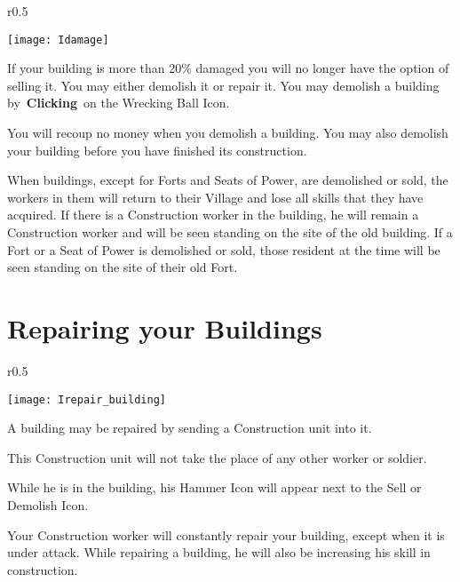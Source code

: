 	
\begin{wrapfigure}{r}{0.5\textwidth}
	\vspace{-20pt}
	\begin{center}
		\texttt{[image: Idamage]}
	\end{center}
	\vspace{-20pt}
\end{wrapfigure}

If your building is more than 20\% damaged you will no longer have the option of selling it. You may either demolish it or repair it. You may demolish a building by \textbf{Clicking} on the Wrecking Ball Icon.

You will recoup no money when you demolish a building. You may also demolish your building before you have finished its construction.

When buildings, except for Forts and Seats of Power, are demolished or sold, the workers in them will return to their Village and lose all skills that they have acquired. If there is a Construction worker in the building, he will remain a Construction worker and will be seen standing on the site of the old building. If a Fort or a Seat of Power is demolished or sold, those resident at the time will be seen standing on the site of their old Fort.

\section{Repairing your Buildings}

	
\begin{wrapfigure}{r}{0.5\textwidth}
	\vspace{-20pt}
	\begin{center}
		\texttt{[image: Irepair\_building]}
	\end{center}
	\vspace{-20pt}
\end{wrapfigure}

A building may be repaired by sending a Construction unit into it. 

This Construction unit will not take the place of any other worker or soldier.

While he is in the building, his Hammer Icon will appear next to the Sell or Demolish Icon.

Your Construction worker will constantly repair your building, except when it is under attack. While repairing a building, he will also be increasing his skill in construction.

